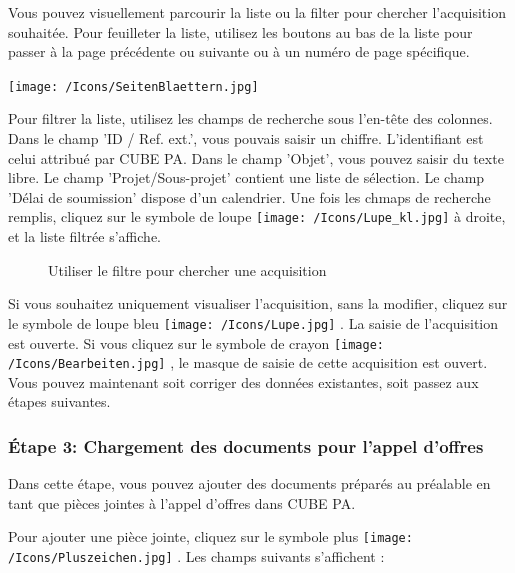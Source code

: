 \vspace{\baselineskip}

Vous pouvez visuellement parcourir la liste ou la filter pour chercher l'acquisition souhaitée. Pour feuilleter la liste, utilisez les boutons au bas de la liste pour passer à la page précédente ou suivante ou à un numéro de page spécifique.

\begin{center}
\texttt{[image: /Icons/SeitenBlaettern.jpg]}
\end{center}

Pour filtrer la liste, utilisez les champs de recherche sous l'en-tête des colonnes. Dans le champ 'ID / Ref. ext.', vous pouvais saisir un chiffre. L'identifiant est celui attribué par CUBE PA. Dans le champ 'Objet', vous pouvez saisir du texte libre. Le champ 'Projet/Sous-projet' contient une liste de sélection. Le champ 'Délai de soumission' dispose d'un calendrier. Une fois les chmaps de recherche remplis, cliquez sur le symbole de loupe \texttt{[image: /Icons/Lupe\_kl.jpg]}  à droite, et la liste filtrée s'affiche.

\begin{figure}[H]
\caption{Utiliser le filtre pour chercher une acquisition}
\end{figure}

Si vous souhaitez uniquement visualiser l'acquisition, sans la modifier, cliquez sur le symbole de loupe bleu \texttt{[image: /Icons/Lupe.jpg]} . La saisie de l'acquisition est ouverte. Si vous cliquez sur le symbole de crayon \texttt{[image: /Icons/Bearbeiten.jpg]} , le masque de saisie de cette acquisition est ouvert.\textcolor{red}{ }Vous pouvez maintenant soit corriger des données existantes, soit passez aux étapes suivantes.

\subsubsection{Étape 3: Chargement des documents pour l'appel d'offres}

Dans cette étape, vous pouvez ajouter des documents préparés au préalable en tant que pièces jointes à l'appel d'offres dans CUBE PA.

\vspace{\baselineskip}

Pour ajouter une pièce jointe, cliquez sur le symbole plus \texttt{[image: /Icons/Pluszeichen.jpg]} . Les champs suivants s'affichent :

